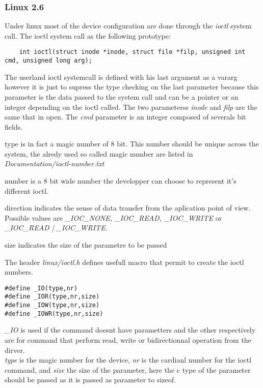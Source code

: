 \documentclass[11pt]{report}
\begin{document}
\subsubsection{Linux 2.6}
Under linux most of the device configuration are done through the  {\it ioctl}
system call. The ioctl system call as the following prototype:
\begin{lstlisting}
	int ioctl(struct inode *inode, struct file *filp, unsigned int cmd, unsigned long arg);
\end{lstlisting}
The userland ioctl systemcall is defined with his last argument as a vararg
however it is just to supress the type checking on the last parameter because this
parameter is the data passed to the system call and can be a pointer or an
integer depending on the ioctl called.
The two parameterss  {\it inode} and  {\it filp} are the same that in open.
The  {\it cmd} parameter is an integer composed of severals bit fields.
\begin{description}
    \item {type} is in fact a magic number of 8 bit. This number should be
    unique across the system, the alredy used so called magic number are listed
    in {\it Documentation/ioctl-number.txt} 
    \item {number} is a 8 bit wide number the developper can choose to
    represent it's different ioctl.
    \item {direction} indicates the sense of data transfer from the aplication
    point of view. Possible values are  {\it \_IOC\_NONE, \_IOC\_READ, \_IOC\_WRITE}
    or  {\it \_IOC\_READ | \_IOC\_WRITE}.
    \item {size} indicates the size of the parametre to be passed
\end{description}
The header  {\it linux/ioctl.h} defines usefull macro that permit to create the
ioctl numbers.
\begin{lstlisting}
#define _IO(type,nr)
#define _IOR(type,nr,size)
#define _IOW(type,nr,size)
#define _IOWR(type,nr,size)
\end{lstlisting}
 {\it \_IO} is used if the command doesnt have parametters and the other
 respectively are for command that perform read, write or bidirectionnal operation from the
 dirver.\\
 {\it type} is the magic number for the device,  {\it nr} is the cardianl
 number for the ioctl command, and  {\it size} the size of the parameter, here
 the c type of the parameter should be passed as it is passed as parameter to
 sizeof.\\
\end{document}
